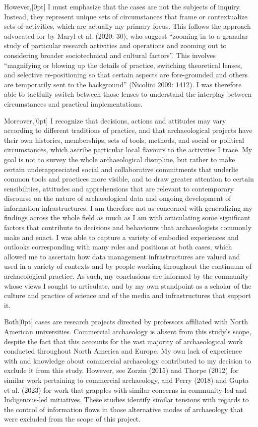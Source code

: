 \documentclass[
]{article}
\newcommand{\paragraphnumber}[1]{\marginnote{\color{lightgray}\tiny{#1}}[0pt]}
\begin{document}
However,\paragraphnumber{[24]} I must emphasize that the cases are not
the subjects of inquiry. Instead, they represent unique sets of
circumstances that frame or contextualize sets of activities, which are
actually my primary focus. This follows the approach advocated for by
Maryl et al. (2020: 30), who suggest ``zooming in to a granular study of
particular research activities and operations and zooming out to
considering broader sociotechnical and cultural factors''. This involves
``magnifying or blowing up the details of practice, switching
theoretical lenses, and selective re-positioning so that certain aspects
are fore-grounded and others are temporarily sent to the background''
(Nicolini 2009: 1412). I was therefore able to tactfully switch between
those lenses to understand the interplay between circumstances and
practical implementations.

Moreover,\paragraphnumber{[25]} I recognize that decisions, actions and
attitudes may vary according to different traditions of practice, and
that archaeological projects have their own histories, memberships, sets
of tools, methods, and social or political circumstances, which ascribe
particular local flavours to the activities I trace. My goal is not to
survey the whole archaeological discipline, but rather to make certain
underappreciated social and collaborative commitments that underlie
common tools and practices more visible, and to draw greater attention
to certain sensibilities, attitudes and apprehensions that are relevant
to contemporary discourse on the nature of archaeological data and
ongoing development of information infrastructures. I am therefore not
as concerned with generalizing my findings across the whole field as
much as I am with articulating some significant factors that contribute
to decisions and behaviours that archaeologists commonly make and enact.
I was able to capture a variety of embodied experiences and outlooks
corresponding with many roles and positions at both cases, which allowed
me to ascertain how data management infrastructures are valued and used
in a variety of contexts and by people working throughout the continuum
of archaeological practice. As such, my conclusions are informed by the
community whose views I sought to articulate, and by my own standpoint
as a scholar of the culture and practice of science and of the media and
infrastructures that support it.

Both\paragraphnumber{[26]} cases are research projects directed by
professors affiliated with North American universities. Commercial
archaeology is absent from this study's scope, despite the fact that
this accounts for the vast majority of archaeological work conducted
throughout North America and Europe. My own lack of experience with and
knowledge about commercial archaeology contributed to my decision to
exclude it from this study. However, see Zorzin (2015) and Thorpe (2012)
for similar work pertaining to commercial archaeology, and Perry (2018)
and Gupta et al. (2023) for work that grapples with similar concerns in
community-led and Indigenous-led initiatives. These studies identify
similar tensions with regards to the control of information flows in
those alternative modes of archaeology that were excluded from the scope
of this project.
\end{document}
